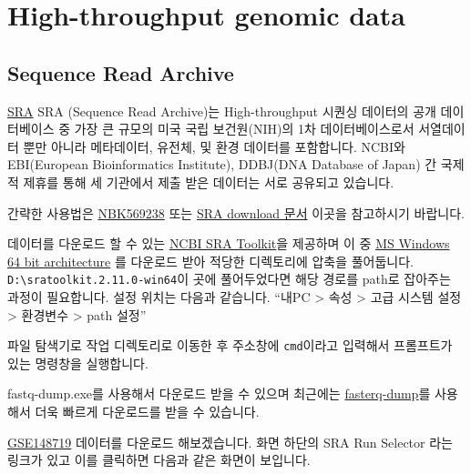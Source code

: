 \documentclass[
]{book}
\begin{document}
\hypertarget{high-throughput-genomic-data}{%
\chapter{High-throughput genomic data}\label{high-throughput-genomic-data}}

\hypertarget{sequence-read-archive}{%
\section{Sequence Read Archive}\label{sequence-read-archive}}

\href{https://www.ncbi.nlm.nih.gov/sra}{SRA} SRA (Sequence Read Archive)는 High-throughput 시퀀싱 데이터의 공개 데이터베이스 중 가장 큰 규모의 미국 국립 보건원(NIH)의 1차 데이터베이스로서 서열데이터 뿐만 아니라 메타데이터, 유전체, 및 환경 데이터를 포함합니다. NCBI와 EBI(European Bioinformatics Institute), DDBJ(DNA Database of Japan) 간 국제적 제휴를 통해 세 기관에서 제출 받은 데이터는 서로 공유되고 있습니다.

간략한 사용법은 \href{https://www.ncbi.nlm.nih.gov/books/NBK569238/}{NBK569238} 또는 \href{https://www.ncbi.nlm.nih.gov/sra/docs/sradownload/}{SRA download 문서} 이곳을 참고하시기 바랍니다.

데이터를 다운로드 할 수 있는 \href{https://trace.ncbi.nlm.nih.gov/Traces/sra/sra.cgi?view=software}{NCBI SRA Toolkit}을 제공하며 이 중 \href{https://ftp-trace.ncbi.nlm.nih.gov/sra/sdk/2.11.0/sratoolkit.2.11.0-win64.zip}{MS Windows 64 bit architecture} 를 다운로드 받아 적당한 디렉토리에 압축을 풀어둡니다. \texttt{D:\textbackslash{}sratoolkit.2.11.0-win64}이 곳에 풀어두었다면 해당 경로를 path로 잡아주는 과정이 필요합니다. 설정 위치는 다음과 같습니다. ``내PC \textgreater{} 속성 \textgreater{} 고급 시스템 설정 \textgreater{} 환경변수 \textgreater{} path 설정''

파일 탐색기로 작업 디렉토리로 이동한 후 주소창에 \texttt{cmd}이라고 입력해서 프롬프트가 있는 명령창을 실행합니다.

fastq-dump.exe를 사용해서 다운로드 받을 수 있으며 최근에는 \href{https://github.com/ncbi/sra-tools/wiki/HowTo:-fasterq-dump}{fasterq-dump}를 사용해서 더욱 빠르게 다운로드를 받을 수 있습니다.

\href{https://www.ncbi.nlm.nih.gov/geo/query/acc.cgi?acc=GSE148719}{GSE148719} 데이터를 다운로드 해보겠습니다. 화면 하단의 SRA Run Selector 라는 링크가 있고 이를 클릭하면 다음과 같은 화면이 보입니다.
\end{document}
